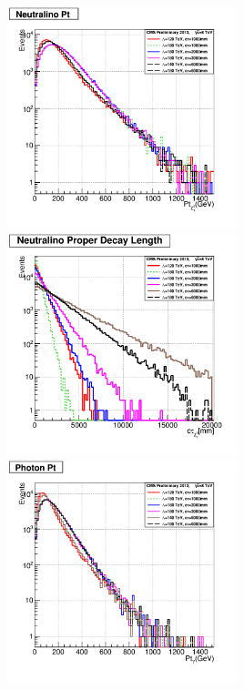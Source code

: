 \begin{minipage}{0.90\linewidth} 
\begin{center}
\centering
\mbox{\includegraphics[height=0.5\textwidth,width=0.5\textwidth]{THESISPLOTS/GMSB-SPS8-MODEL-Neutralinio-Pt.png} \hspace{-1cm}
\includegraphics[height=0.5\textwidth,width=0.5\textwidth]{THESISPLOTS/GMSB-SPS8-MODEL-Neutralino-Proper-DecayLength.png}} \\
\hspace{0.5cm}
\mbox{\includegraphics[height=0.5\textwidth,width=0.5\textwidth]{THESISPLOTS/GMSB-SPS8-MODEL-Photon-Pt.png}}
\label{fig:NKINE}
\end{center}
\end{minipage}
